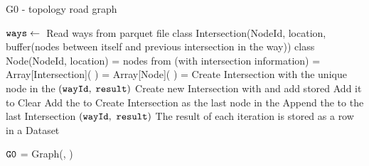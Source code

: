 \begin{algorithm}[H]
	\caption{G0 - topology road graph} 	\label{alg:g0}	
	\begin{algorithmic}[1]
        \Statex
        \State $\texttt{ways} \leftarrow{}$ Read ways from parquet file
        \State class Intersection(NodeId, location, buffer(nodes between itself and previous intersection in the way))
        \State class Node(NodeId, location)
		\State {} = nodes from  (with intersection information) 
        \State {} = Array[Intersection]( )  
        \State {} = Array[Node]( )
            \State {} = Create Intersection with the unique node in the 
            \State \Return $(\texttt{wayId},$ $\texttt{result})$
            \Else
                    \State Create new Intersection with  and add stored  
                    \State Add it to  
                    \State Clear 
                \Else
                    \State Add the  to 
                \EndIf
                    \State Create Intersection as the last node in the 
                    \Else
                    \State Append the  to the last Intersection
                    \EndIf
                \EndIf
            \EndFor
            \State {}
            \State \Return $(\texttt{wayId},$ $\texttt{result})$
            \EndIf
		\EndFor
		\State The result of each iteration is stored as a row in a Dataset
		\Statex
		
		\State {}
		\State {}
		\State $\texttt{G0}$ = Graph(, )
	\end{algorithmic} 
\end{algorithm}


